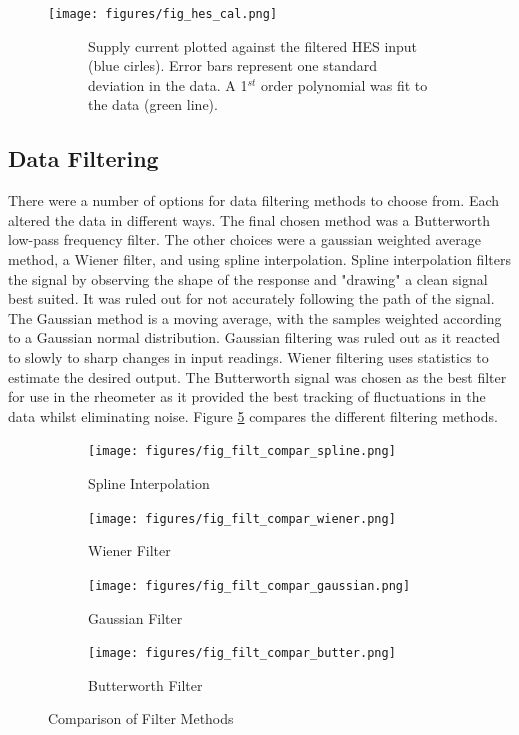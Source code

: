 \documentclass[twoside,a4]{report}
\begin{document}
	\begin{figure}[!htb]
		\centering
		\texttt{[image: figures/fig\_hes\_cal.png]}
		\caption{Current Sensor Evaluation Results}
		\label{figcurevalres}
		\begin{subfigure}{0.9\textwidth}
			\footnotesize Supply current plotted against the filtered HES input (blue cirles). Error bars represent one standard deviation in the data. A 1$^{st}$ order polynomial was fit to the data (green line).
		\end{subfigure}
	\end{figure}
	
	\subsection*{Data Filtering}
	There were a number of options for data filtering methods to choose from. Each altered the data in different ways. The final chosen method was a Butterworth low-pass frequency filter. The other choices were a gaussian weighted average method, a Wiener filter, and using spline interpolation. Spline interpolation filters the signal by observing the shape of the response and "drawing" a clean signal best suited. It was ruled out for not accurately following the path of the signal. The Gaussian method is a moving average, with the samples weighted according to a Gaussian normal distribution. Gaussian filtering was ruled out as it reacted to slowly to sharp changes in input readings. Wiener filtering uses statistics to estimate the desired output. The Butterworth signal was chosen as the best filter for use in the rheometer as it provided the best tracking of fluctuations in the data whilst eliminating noise. Figure \ref{figfiltcomp} compares the different filtering methods.\\
	
	\begin{figure}[!htb]
		\centering
		\begin{subfigure}[t]{0.22\textwidth}
			\centering
			\texttt{[image: figures/fig\_filt\_compar\_spline.png]}
			\caption{Spline Interpolation}
			\label{figfiltsp}
			\footnotesize
		\end{subfigure}
		\begin{subfigure}[t]{0.22\textwidth}
			\centering
			\texttt{[image: figures/fig\_filt\_compar\_wiener.png]}
			\caption{Wiener Filter}
			\label{figfiltwi}
			\footnotesize
		\end{subfigure}
		\begin{subfigure}[t]{0.22\textwidth}
			\centering
			\texttt{[image: figures/fig\_filt\_compar\_gaussian.png]}
			\caption{Gaussian Filter}
			\label{figfiltga}
			\footnotesize
		\end{subfigure}
		\begin{subfigure}[t]{0.22\textwidth}
			\centering
			\texttt{[image: figures/fig\_filt\_compar\_butter.png]}
			\caption{Butterworth Filter}
			\label{figfiltbu}
			\footnotesize
		\end{subfigure}
		\caption{Comparison of Filter Methods \label{figfiltcomp}}
	\end{figure}
	
\end{document}
